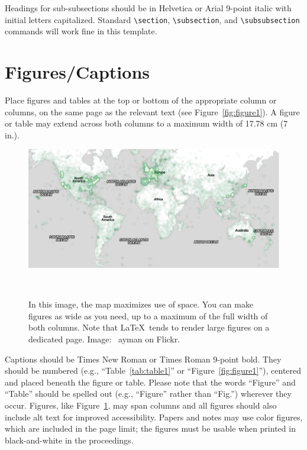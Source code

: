 \documentclass{sigchi}
\begin{document}
Headings for sub-subsections should be in Helvetica or Arial 9-point
italic with initial letters capitalized.  Standard
\texttt{{\textbackslash}section}, \texttt{{\textbackslash}subsection},
and \texttt{{\textbackslash}subsubsection} commands will work fine in
this template.

\section{Figures/Captions}

Place figures and tables at the top or bottom of the appropriate
column or columns, on the same page as the relevant text (see
Figure~\ref{fig:figure1}). A figure or table may extend across both
columns to a maximum width of 17.78 cm (7 in.).

\begin{figure}
  \centering
  \includegraphics[width=1.75\columnwidth]{figures/map}
  \caption{In this image, the map maximizes use of space. You can make
    figures as wide as you need, up to a maximum of the full width of
    both columns. Note that \LaTeX\ tends to render large figures on a
    dedicated page. Image: \ccbynd~ayman on
    Flickr.}~\label{fig:figure2}
\end{figure}

Captions should be Times New Roman or Times Roman 9-point bold.  They
should be numbered (e.g., ``Table~\ref{tab:table1}'' or
``Figure~\ref{fig:figure1}''), centered and placed beneath the figure
or table.  Please note that the words ``Figure'' and ``Table'' should
be spelled out (e.g., ``Figure'' rather than ``Fig.'') wherever they
occur. Figures, like Figure~\ref{fig:figure2}, may span columns and
all figures should also include alt text for improved accessibility.
Papers and notes may use color figures, which are included in the page
limit; the figures must be usable when printed in black-and-white in
the proceedings.
\end{document}
